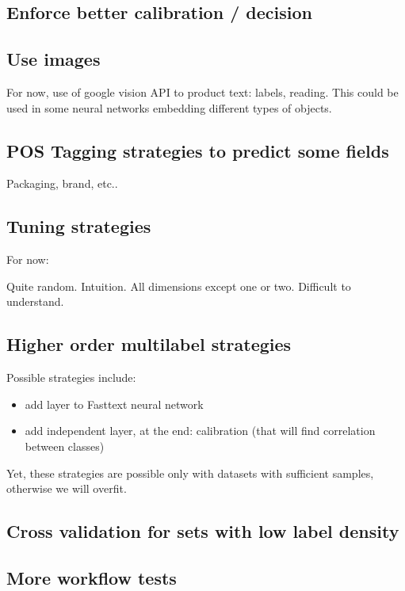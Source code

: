 \subsection{Enforce better calibration / decision}
\subsection{Use images}
For now, use of google vision API to product text: labels, reading. This could be used in some neural networks embedding different types of objects.
\subsection{POS Tagging strategies to predict some fields}
Packaging, brand, etc..

\subsection{Tuning strategies}

For now: 

Quite random. Intuition. All dimensions except one or two. Difficult to understand.

\subsection{Higher order multilabel strategies}
Possible strategies include:
\begin{itemize}
	\item add layer to Fasttext neural network
	\item add independent layer, at the end: calibration (that will find correlation between classes)
\end{itemize}

Yet, these strategies are possible only with datasets with sufficient samples, otherwise we will overfit.

\subsection{Cross validation for sets with low label density}

\subsection{More workflow tests}
